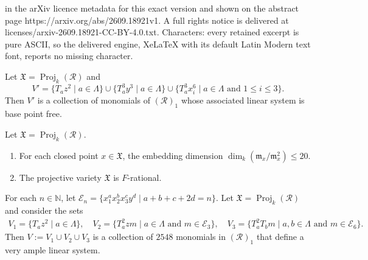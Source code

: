 \documentclass[10pt,a4paper]{amsart}
\newcommand{\NN}{\mathbb{N}}
\newcommand{\Proj}{\operatorname{Proj}}
\newcommand{\fm}{\mathfrak{m}}
\begin{document}
in the arXiv licence metadata for this exact version and shown on the abstract page https://arxiv.org/abs/2609.18921v1. A full rights notice is delivered at licenses/arxiv-2609.18921-CC-BY-4.0.txt. Characters: every retained excerpt is pure ASCII, so the delivered engine, XeLaTeX with its default Latin Modern text font, reports no missing character.
\begin{lemma}
    \label{lem: An affine cover of X}
    Let $\mathfrak{X} = \Proj_{k}(\mathcal{R})$ and
    \[
    V'=\{T_az^2\mid a\in\Lambda\}\cup \{T_a^3y^3\mid a\in\Lambda\}\cup\{T_a^3x_i^6\mid a\in\Lambda\mbox{ and }1\leq i\leq 3 \}.
    \]
    Then $V'$ is a collection of monomials of $\left(\mathcal{R}\right)_1$ whose associated linear system is base point free.
\end{lemma}

\begin{corollary}
    \label{cor: X is F-rational}
    Let $\mathfrak{X} = \Proj_k(\mathcal{R})$.
    \begin{enumerate}[label=(\alph*)]
        \item For each closed point $x\in \mathfrak{X}$, the embedding dimension $\dim_k(\fm_x/\fm_{x}^2)\leq 20$.
        \item The projective variety $\mathfrak{X}$ is $F$-rational.
    \end{enumerate}
\end{corollary}

\begin{lemma}
    \label{lem: the embedding of the projective variety}
    For each $n\in\NN$, let $\mathcal{E}_n = \{x_1^ax_2^bx_3^cy^d\mid a+b+c+2d = n\}$. Let $\mathfrak{X} = \Proj_k(\mathcal{R})$ and consider the sets
\begin{align*}
    V_1 = \{T_az^2\mid a\in\Lambda\},\quad V_2 = \{T_a^2zm\mid a\in\Lambda\mbox{ and }m \in\mathcal{E}_3\}, \quad V_3 = \{T_a^2T_bm\mid a,b\in\Lambda\mbox{ and }m \in\mathcal{E}_6\}.
\end{align*}
    Then $V := V_1\cup V_2\cup V_3$ is a collection of $2548$ monomials in $\left(\mathcal{R}\right)_1$ that define a very ample linear system.
\end{lemma}
\end{document}
